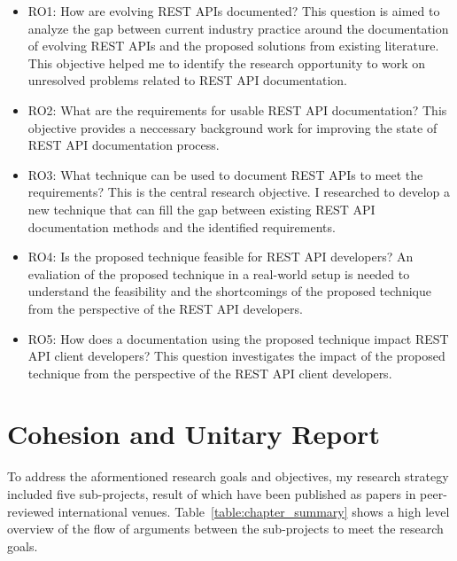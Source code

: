 \begin{itemize}
  \item RO1: How are evolving REST APIs documented? This question is aimed to analyze the gap between current industry practice around the documentation of evolving REST APIs and the proposed solutions from existing literature. This objective helped me to identify the research opportunity to work on unresolved problems related to REST API documentation.
  \item RO2: What are the requirements for usable REST API documentation? This objective provides a neccessary background work for improving the state of REST API documentation process.
  \item RO3: What technique can be used to document REST APIs to meet the requirements? This is the central research objective. I researched to develop a new technique that can fill the gap between existing REST API documentation methods and the identified requirements.
  \item RO4: Is the proposed technique feasible for REST API developers? An evaliation of the proposed technique in a real-world setup is needed to understand the feasibility and the shortcomings of the proposed technique from the perspective of the REST API developers.
  \item RO5: How does a documentation using the proposed technique impact REST API client developers? This question investigates the impact of the proposed technique from the perspective of the REST API client developers.
\end{itemize}

\section{Cohesion and Unitary Report}
To address the aformentioned research goals and objectives, my research strategy included five sub-projects, result of which have been published as papers in peer-reviewed international venues. Table~\ref{table:chapter_summary} shows a high level overview of the flow of arguments between the sub-projects to meet the research goals.

